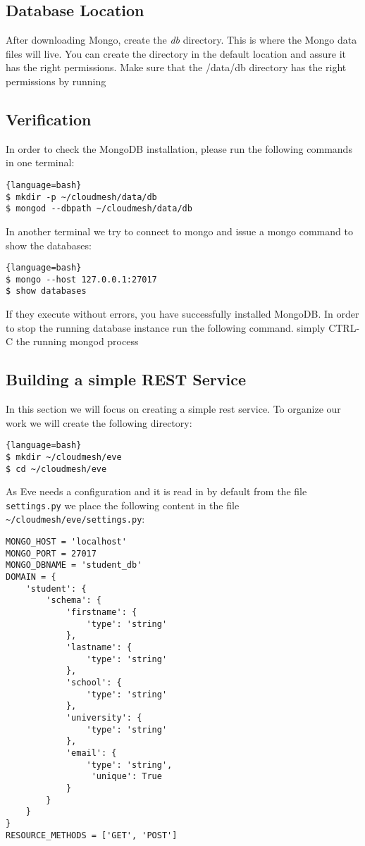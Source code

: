 \subsection{Database Location}
After downloading Mongo, create the {\em db} directory. This is where
the Mongo data files will live. You can create the directory in the
default location and assure it has the right permissions. Make sure
that the /data/db directory has the right permissions by running

\subsection{Verification}

In order to check the MongoDB installation, please run the following
commands in one terminal:

\begin{lstlisting}{language=bash}
$ mkdir -p ~/cloudmesh/data/db
$ mongod --dbpath ~/cloudmesh/data/db
\end{lstlisting}

In another terminal we try to connect to mongo and issue a mongo
command to show the databases:

\begin{lstlisting}{language=bash}
$ mongo --host 127.0.0.1:27017
$ show databases
\end{lstlisting}

If they execute without errors, you have successfully installed
MongoDB. In order to stop the running database instance run the
following command. simply CTRL-C the running mongod process

\subsection{Building a simple REST Service}

In this section we will focus on creating a simple rest service. To
organize our work we will create the following directory:


\begin{lstlisting}{language=bash}
$ mkdir ~/cloudmesh/eve
$ cd ~/cloudmesh/eve
\end{lstlisting}

As Eve needs a configuration and it is read in by default from the
file \verb|settings.py| we place the following content in the file
\verb|~/cloudmesh/eve/settings.py|:

\begin{lstlisting}
MONGO_HOST = 'localhost'
MONGO_PORT = 27017
MONGO_DBNAME = 'student_db'
DOMAIN = {
    'student': {
        'schema': {
            'firstname': {
                'type': 'string'
            },
            'lastname': {
                'type': 'string'
            },
            'school': {
                'type': 'string'
            },
            'university': {
                'type': 'string'
            },
            'email': {
                'type': 'string',
                 'unique': True
            }
        }
    }
}
RESOURCE_METHODS = ['GET', 'POST']
\end{lstlisting}

